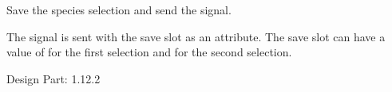 \documentclass[letterpaper,10pt,english]{sphinxmanual}
\begin{document}
\begin{fulllineitems}
\begin{fulllineitems}
\label{setlyze/gui:setlyze.gui.SelectSpecies.save_selection}
Save the species selection and send the
 signal.

The  signal is sent with the save slot
as an attribute. The save slot can have a value of  for the
first selection and  for the second selection.

Design Part: 1.12.2

\end{fulllineitems}


\end{fulllineitems}

\end{document}
